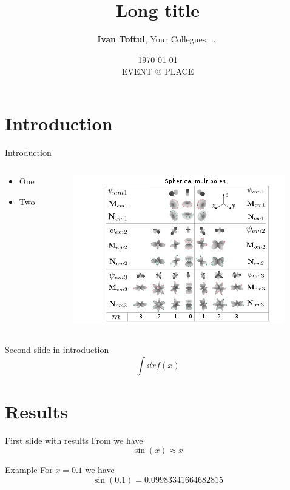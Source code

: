 \documentclass[
aspectratio=169,
16pt,
xcolor={dvipsnames} %
]{beamer}
\title[Short title]{\textbf{Long title}}
\author[Ivan Toftul]{
	\textbf{Ivan Toftul}, 
	Your Collegues, ...
}
\institute[ANU]{
	Australian National University \\ 
	\medskip
	\texttt{toftul.ivan@gmail.com} 
}
\date{
	\small{\today \\ EVENT @ PLACE}
}
\begin{document}
	
	\begin{frame}
		\titlepage 
	\end{frame}
	
	\section{Introduction}
	
	\begin{frame}[c]{Introduction}
		\begin{columns}
			\begin{column}{0.4\linewidth}
				\begin{itemize}
					\item One
					\item Two
				\end{itemize}
			\end{column}
			\begin{column}{0.6\linewidth}
				\begin{figure}
					\includegraphics[width=1.0\linewidth]{fig/VSHwiki}
				\end{figure}
			\end{column}
		\end{columns}
	\end{frame}
	
	\begin{frame}[c]{Second slide in introduction}
		\[
			\int \dd x f(x)
		\]
	\end{frame}
	
	
	
	\section{Results}
	\begin{frame}[c]{First slide with results}
		From  we have
		\[
			\sin(x) \approx x
		\]
		\begin{block}{Example}
			For $x = 0.1$ we have 
			\[
				\sin (0.1) = 0.09983341664682815
			\]
		\end{block}
	\end{frame}
	
\end{document}
